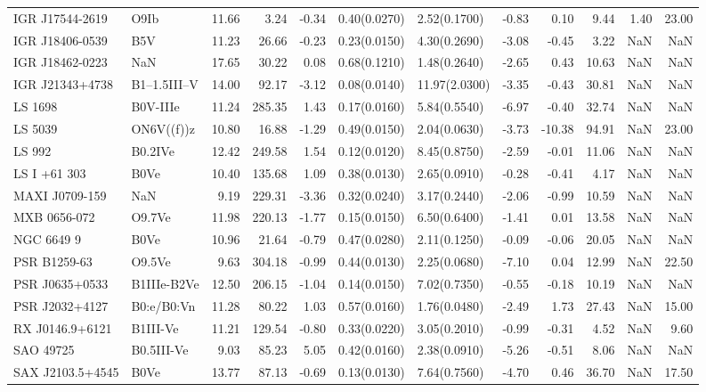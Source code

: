 \begin{longtable}{llrrrllrrrrr}
IGR J17544-2619 & O9Ib & 11.66 & 3.24 & -0.34 & 0.40(0.0270) & 2.52(0.1700) & -0.83 & 0.10 & 9.44 & 1.40 & 23.00 \\
IGR J18406-0539 & B5V & 11.23 & 26.66 & -0.23 & 0.23(0.0150) & 4.30(0.2690) & -3.08 & -0.45 & 3.22 & NaN & NaN \\
IGR J18462-0223 & NaN & 17.65 & 30.22 & 0.08 & 0.68(0.1210) & 1.48(0.2640) & -2.65 & 0.43 & 10.63 & NaN & NaN \\
IGR J21343+4738 & B1--1.5III--V & 14.00 & 92.17 & -3.12 & 0.08(0.0140) & 11.97(2.0300) & -3.35 & -0.43 & 30.81 & NaN & NaN \\
LS 1698 & B0V-IIIe & 11.24 & 285.35 & 1.43 & 0.17(0.0160) & 5.84(0.5540) & -6.97 & -0.40 & 32.74 & NaN & NaN \\
LS 5039 & ON6V((f))z & 10.80 & 16.88 & -1.29 & 0.49(0.0150) & 2.04(0.0630) & -3.73 & -10.38 & 94.91 & NaN & 23.00 \\
LS 992 & B0.2IVe & 12.42 & 249.58 & 1.54 & 0.12(0.0120) & 8.45(0.8750) & -2.59 & -0.01 & 11.06 & NaN & NaN \\
LS I +61 303 & B0Ve & 10.40 & 135.68 & 1.09 & 0.38(0.0130) & 2.65(0.0910) & -0.28 & -0.41 & 4.17 & NaN & NaN \\
MAXI J0709-159 & NaN & 9.19 & 229.31 & -3.36 & 0.32(0.0240) & 3.17(0.2440) & -2.06 & -0.99 & 10.59 & NaN & NaN \\
MXB 0656-072 & O9.7Ve & 11.98 & 220.13 & -1.77 & 0.15(0.0150) & 6.50(0.6400) & -1.41 & 0.01 & 13.58 & NaN & NaN \\
NGC 6649 9 & B0Ve & 10.96 & 21.64 & -0.79 & 0.47(0.0280) & 2.11(0.1250) & -0.09 & -0.06 & 20.05 & NaN & NaN \\
PSR B1259-63 & O9.5Ve & 9.63 & 304.18 & -0.99 & 0.44(0.0130) & 2.25(0.0680) & -7.10 & 0.04 & 12.99 & NaN & 22.50 \\
PSR J0635+0533 & B1IIIe-B2Ve & 12.50 & 206.15 & -1.04 & 0.14(0.0150) & 7.02(0.7350) & -0.55 & -0.18 & 10.19 & NaN & NaN \\
PSR J2032+4127 & B0:e/B0:Vn & 11.28 & 80.22 & 1.03 & 0.57(0.0160) & 1.76(0.0480) & -2.49 & 1.73 & 27.43 & NaN & 15.00 \\
RX J0146.9+6121 & B1III-Ve & 11.21 & 129.54 & -0.80 & 0.33(0.0220) & 3.05(0.2010) & -0.99 & -0.31 & 4.52 & NaN & 9.60 \\
SAO 49725 & B0.5III-Ve & 9.03 & 85.23 & 5.05 & 0.42(0.0160) & 2.38(0.0910) & -5.26 & -0.51 & 8.06 & NaN & NaN \\
SAX J2103.5+4545 & B0Ve & 13.77 & 87.13 & -0.69 & 0.13(0.0130) & 7.64(0.7560) & -4.70 & 0.46 & 36.70 & NaN & 17.50 \\

\end{longtable}
